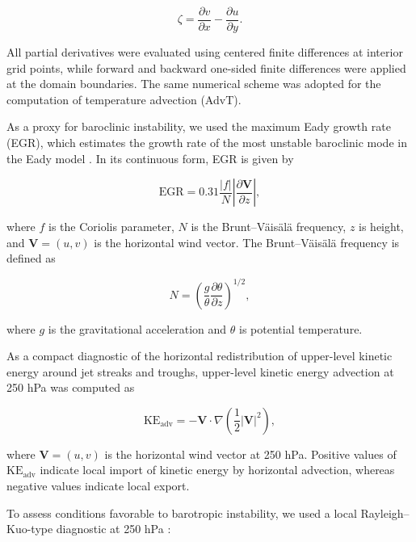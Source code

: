 \documentclass[pdflatex,sn-chicago]{sn-jnl}%
\theoremstyle{plain}
\theoremstyle{definition}
\theoremstyle{remark}
\theoremstyle{definition}
\begin{document}
\begin{equation}
\zeta = \frac{\partial v}{\partial x} - \frac{\partial u}{\partial y}.
\end{equation}

All partial derivatives were evaluated using centered finite differences at interior grid points, while forward and backward one-sided finite differences were applied at the domain boundaries. The same numerical scheme was adopted for the computation of temperature advection (AdvT).

As a proxy for baroclinic instability, we used the maximum Eady growth rate (EGR), which estimates the growth rate of the most unstable baroclinic mode in the Eady model \citep{eady1949long,lindzen1980simple}. In its continuous form, EGR is given by

\begin{equation}
\mathrm{EGR} = 0.31 \frac{|f|}{N} \left| \frac{\partial \mathbf{V}}{\partial z} \right|,
\end{equation}

where \(f\) is the Coriolis parameter, \(N\) is the Brunt--V\"ais\"al\"a frequency, \(z\) is height, and \(\mathbf{V}=(u,v)\) is the horizontal wind vector. The Brunt--V\"ais\"al\"a frequency is defined as

\begin{equation}
N = \left( \frac{g}{\theta} \frac{\partial \theta}{\partial z} \right)^{1/2},
\end{equation}

where \(g\) is the gravitational acceleration and \(\theta\) is potential temperature.

As a compact diagnostic of the horizontal redistribution of upper-level kinetic energy around jet streaks and troughs, upper-level kinetic energy advection at 250 hPa was computed as

\begin{equation}
\mathrm{KE}_{\mathrm{adv}}
=
-\mathbf{V}\cdot\nabla\left(\frac{1}{2}\lvert \mathbf{V}\rvert^2\right),
\end{equation}

where \(\mathbf{V}=(u,v)\) is the horizontal wind vector at 250 hPa. Positive values of \(\mathrm{KE}_{\mathrm{adv}}\) indicate local import of kinetic energy by horizontal advection, whereas negative values indicate local export.

To assess conditions favorable to barotropic instability, we used a local Rayleigh--Kuo-type diagnostic at 250 hPa \citep{rayleigh1895stability,kuo1949dynamic}:
\end{document}
